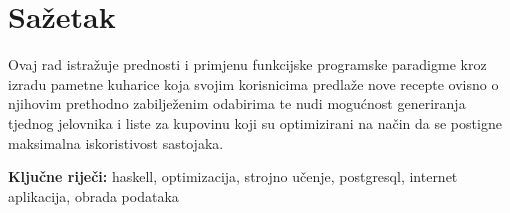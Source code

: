 \chapter*{Sažetak}

Ovaj rad istražuje prednosti i primjenu funkcijske programske paradigme kroz izradu pametne kuharice koja svojim korisnicima predlaže nove recepte ovisno o njihovim prethodno zabilježenim odabirima te nudi mogućnost generiranja tjednog jelovnika i liste za kupovinu koji su optimizirani na način da se postigne maksimalna iskoristivost sastojaka.

\textbf{Ključne riječi:} haskell, optimizacija, strojno učenje, postgresql, internet aplikacija, obrada podataka